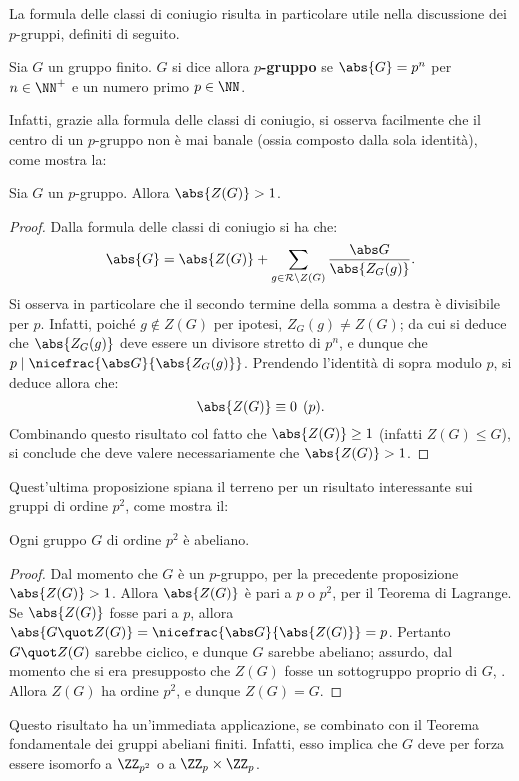 \documentclass[12pt]{scrartcl}
\begin{document}
	
	La formula delle classi di coniugio risulta in particolare utile nella discussione
	dei $p$-gruppi, definiti di seguito.
	
	\begin{definition}[$p$-gruppo]
		Sia $G$ un gruppo finito. $G$ si dice allora \textbf{$p$-gruppo} se
		$\abs{G} = p^n$ per $n \in \NN^+$ e un numero primo $p \in \NN$.
	\end{definition}
	
	Infatti, grazie alla formula delle classi di coniugio, si osserva facilmente che il centro di un $p$-gruppo non è mai banale (ossia composto dalla sola identità), come mostra la:
	
	\begin{proposition}
		Sia $G$ un $p$-gruppo. Allora $\abs{Z(G)} > 1$. 
	\end{proposition}
	
	\begin{proof}
		Dalla formula delle classi di coniugio si ha che:
		\[ \abs{G} = \abs{Z(G)} + \sum_{g \in \mathcal{R} \setminus Z(G)} \frac{\abs G}{\abs{Z_G(g)}}. \]
		Si osserva in particolare che il secondo termine della somma a destra è divisibile
		per $p$. Infatti, poiché $g \notin Z(G)$ per ipotesi, $Z_G(g) \neq Z(G)$; da cui
		si deduce che $\abs{Z_G(g)}$ deve essere un divisore stretto di $p^n$, e dunque
		che $p \mid \nicefrac{\abs G}{\abs{Z_G(g)}}$. Prendendo l'identità di sopra modulo
		$p$, si deduce allora che:
		\[ \abs{Z(G)} \equiv 0 \pod p. \]
		Combinando questo risultato col fatto che $\abs{Z(G)} \geq 1$ (infatti $Z(G) \leq G$),
		si conclude che deve valere necessariamente che $\abs{Z(G)} > 1$.
	\end{proof} \medskip
	
	
	Quest'ultima proposizione spiana il terreno per un risultato interessante sui
	gruppi di ordine $p^2$, come mostra il:
	
	\begin{theorem}
		Ogni gruppo $G$ di ordine $p^2$ è abeliano.
	\end{theorem}
	
	\begin{proof}
		Dal momento che $G$ è un $p$-gruppo, per la precedente proposizione
		$\abs{Z(G)} > 1$. Allora $\abs{Z(G)}$ è pari a $p$ o $p^2$, per il
		Teorema di Lagrange. Se $\abs{Z(G)}$ fosse pari a $p$, allora
		$\abs{G \quot Z(G)} = \nicefrac{\abs G}{\abs{Z(G)}} = p$. Pertanto
		$G \quot Z(G)$ sarebbe ciclico, e dunque $G$ sarebbe abeliano; assurdo,
		dal momento che si era presupposto che $Z(G)$ fosse un sottogruppo proprio
		di $G$, \Lightning. Allora $Z(G)$ ha ordine $p^2$,
		e dunque $Z(G) = G$.
	\end{proof}
	
	Questo risultato ha un'immediata applicazione, se combinato con il Teorema
	fondamentale dei gruppi abeliani finiti. Infatti, esso implica che
	$G$ deve per forza essere isomorfo a $\ZZ_{p^2}$ o a $\ZZ_{p} \times \ZZ_{p}$.
\end{document}

